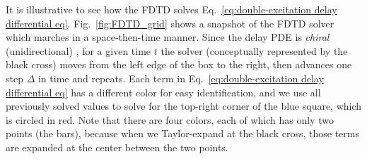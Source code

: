 \documentclass[final,1p,times]{elsarticle}
\newcounter{bla}
\begin{document}


It is illustrative to see how the FDTD solves Eq.~\eqref{eq:double-excitation delay differential eq}. Fig.~\ref{fig:FDTD_grid} shows a snapshot of the FDTD solver which marches in a space-then-time manner. Since the delay PDE is \emph{chiral} (unidirectional) \cite{FangNJP18}, for a given time $t$ the solver (conceptually represented by the black cross) moves from the left edge of the box to the right, then advances one step $\Delta$ in time and repeats. Each term in Eq.~\eqref{eq:double-excitation delay differential eq} has a different color for easy identification, and we use all previously solved values to solve for the top-right corner of the blue square, which is circled in red. Note that there are four colors, each of which has only two points (the bars), because when we Taylor-expand at the black cross, those terms are expanded at the center between the two points. 
\end{document}
